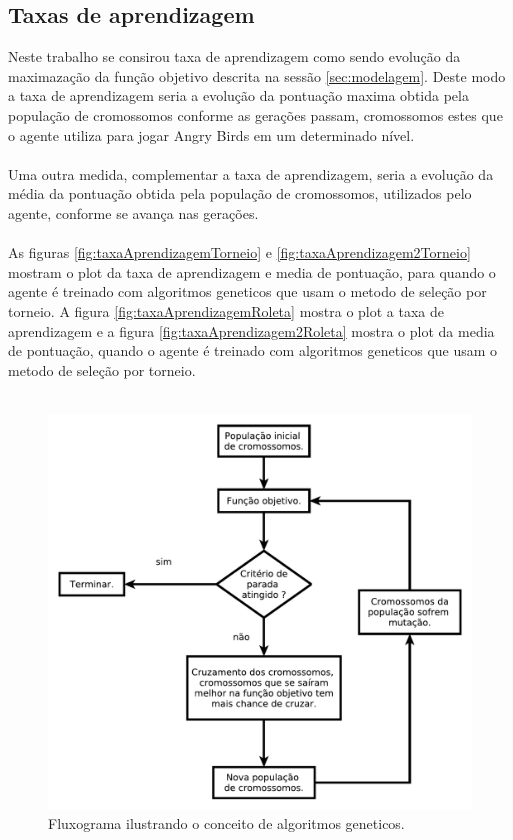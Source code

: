 \documentclass[10pt,a4paper]{article}
\begin{document}
\subsection{Taxas de aprendizagem} 
Neste trabalho se consirou taxa de aprendizagem como sendo evolução da maximazação da função objetivo descrita na sessão \ref{sec:modelagem}. Deste modo a taxa de aprendizagem seria a evolução da pontuação maxima obtida pela população de cromossomos conforme as gerações passam, cromossomos estes que o agente utiliza para jogar Angry Birds em um determinado nível. \\ \\
Uma outra medida, complementar a taxa de aprendizagem, seria a evolução da média da pontuação obtida pela população de cromossomos, utilizados pelo agente, conforme se avança nas gerações. \\ \\
As figuras \ref{fig:taxaAprendizagemTorneio} e \ref{fig:taxaAprendizagem2Torneio} mostram o plot da taxa de aprendizagem e media de pontuação, para quando o agente é treinado com algoritmos geneticos que usam o metodo de seleção por torneio. A figura \ref{fig:taxaAprendizagemRoleta}  mostra o plot a taxa de aprendizagem e a figura \ref{fig:taxaAprendizagem2Roleta}  mostra o plot da media de pontuação, quando o agente é treinado com algoritmos geneticos que usam o metodo de seleção por torneio. \\ \\
\begin{figure}[H]
  \center
  \includegraphics[scale=0.6]{imgs/diagramaAG.pdf}            
  \caption{Fluxograma ilustrando o conceito de algoritmos geneticos.}
  \label{fig:MostrandoOCruzamentoUniforme}
\end{figure}
\end{document}
